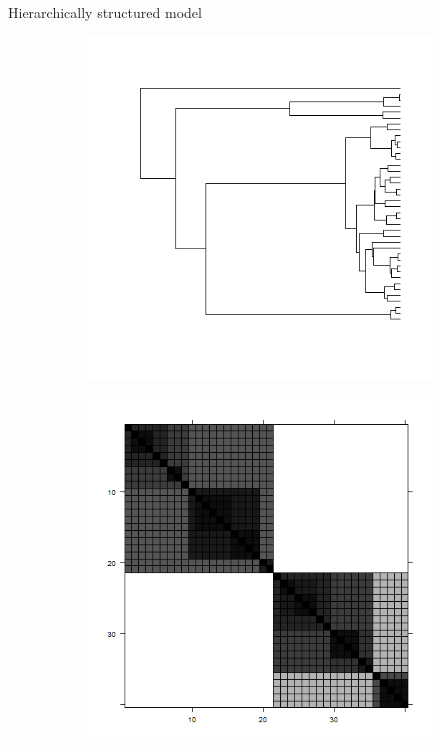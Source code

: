 \documentclass[11pt]{beamer}
\begin{document}
										
										\begin{frame}{Hierarchically structured model}
											\begin{figure}[H]
												\begin{subfigure}[b]{0.4\textwidth}
													\centering
													\includegraphics[width=\textwidth]{images/coalescent-tree.png}
												\end{subfigure}
												\hfill
												\begin{subfigure}[b]{0.4\textwidth}
													\centering
													\includegraphics[width=\textwidth]{images/cov-mat-OU-process-on-coalescent-tree.png}

\end{subfigure}
\end{figure}
\end{frame}
\end{document}
